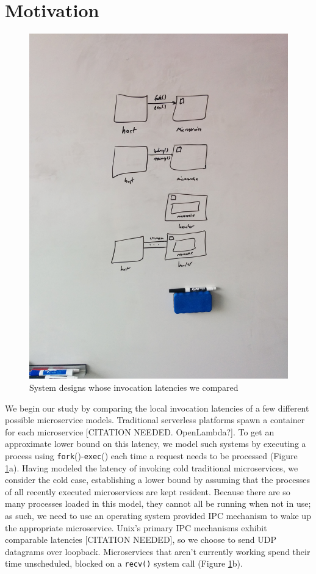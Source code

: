 \section{Motivation}
\label{sec:motive}

\begin{figure}
\includegraphics[width=\columnwidth]{figs/IMG_20180125_135549}
\caption{System designs whose invocation latencies we compared}
\label{fig:invocationdesigns}
\end{figure}

We begin our study by comparing the local invocation latencies of a few different possible microservice models.
Traditional serverless platforms spawn a container for each microservice [CITATION NEEDED. OpenLambda?].
To get an approximate lower bound on this latency, we model such systems by executing a process using \texttt{fork}()-\texttt{exec}() each time a request needs to be processed (Figure \ref{fig:invocationdesigns}a).
Having modeled the latency of invoking cold traditional microservices, we consider the cold case, establishing a lower bound by assuming that the processes of all recently executed microservices are kept resident.
Because there are so many processes loaded in this model, they cannot all be running when not in use; as such, we need to use an operating system provided IPC mechanism to wake up the appropriate microservice.
Unix's primary IPC mechanisms exhibit comparable latencies [CITATION NEEDED], so we choose to send UDP datagrams over loopback.
Microservices that aren't currently working spend their time unscheduled, blocked on a \texttt{recv()} system call (Figure \ref{fig:invocationdesigns}b).

